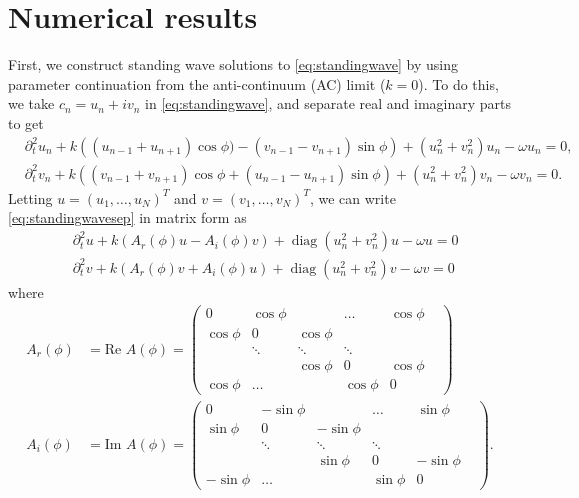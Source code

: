 \documentclass[11pt,reqno]{amsart}
\DeclareMathOperator{\diag}{diag}
\begin{document}
\section{Numerical results}\label{sec:numerics}

First, we construct standing wave solutions to \cref{eq:standingwave} by using parameter continuation from the anti-continuum (AC) limit ($k=0$). To do this, we take $c_n = u_n + i v_n$ in \cref{eq:standingwave}, and separate real and imaginary parts to get
\begin{equation}\label{eq:standingwavesep}
\begin{aligned}
&\partial_t^2 u_n + k\left( (u_{n-1} + u_{n+1}) \cos \phi ) - (v_{n-1} - v_{n+1})\sin \phi \right) + (u_n^2+v_n^2) u_n - \omega u_n= 0, \\
&\partial_t^2 v_n + k\left( (v_{n-1} + v_{n+1} ) \cos \phi + (u_{n-1}- u_{n+1})\sin \phi \right) +(u_n^2+v_n^2) v_n - \omega v_n = 0.
\end{aligned}
\end{equation}
Letting $u = (u_1, \dots, u_N)^T$ and $v = (v_1, \dots, v_N)^T$, we can write \cref{eq:standingwavesep} in matrix form as 
\begin{equation}\label{eq:standingwavematrixsep}
\begin{aligned}
&\partial_t^2 u + k (A_r(\phi) u - A_i(\phi) v) + \diag\left(u_n^2 + v_n^2 \right)u - \omega u = 0 \\
&\partial_t^2 v + k (A_r(\phi) v + A_i(\phi) u) + \diag\left(u_n^2 + v_n^2 \right)v - \omega v = 0
\end{aligned}
\end{equation}
where
\begin{align*}
A_r(\phi) &= \text{Re } A(\phi) = \begin{pmatrix}
0 & \cos \phi & & \dots & \cos \phi \\
\cos \phi & 0 & \cos \phi & & & \\
& \ddots & \ddots & \ddots &  & \\
 & &\cos \phi  & 0 & \cos \phi  \\
\cos \phi& \dots & & \cos \phi & 0
\end{pmatrix} \\
A_i(\phi) &= \text{Im } A(\phi) = \begin{pmatrix}
0 & -\sin \phi & & \dots & \sin \phi \\
\sin \phi & 0 & -\sin \phi & & & \\
& \ddots & \ddots & \ddots &  & \\
 & &\sin \phi  & 0 & -\sin \phi  \\
-\sin \phi& \dots & & \sin \phi & 0
\end{pmatrix}.
\end{align*}
\end{document}
